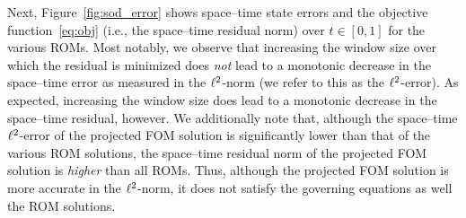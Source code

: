 Next, Figure~\ref{fig:sod_error} shows space--time state errors and the objective function~\eqref{eq:obj} (i.e., the space--time residual norm) over $t \in [0,1]$ for the various ROMs. Most notably, we observe 
that increasing the window size over which the residual is minimized does \textit{not} lead to a monotonic decrease in the space--time error as measured in the $\ell^2$-norm (we refer to this as the $\ell^2$-error). As expected, increasing the window size does lead to a monotonic decrease in the space--time residual, however. We additionally note that, although the space--time
$\ell^2$-error of 
the projected FOM solution is significantly lower than that of the various ROM solutions, the space--time residual norm of the projected FOM solution is \textit{higher} 
than all ROMs. Thus, although the projected FOM solution is more accurate in the $\ell^2$-norm, it does not satisfy the governing equations as well the ROM solutions. 

